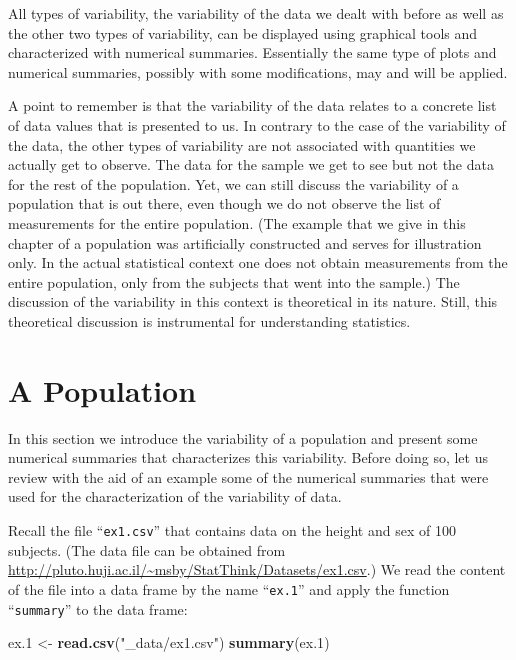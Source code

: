 \documentclass[
]{krantz}
\makeatletter
\newenvironment{Shaded}{\begin{snugshade}}{\end{snugshade}}
\newcommand{\FloatTok}[1]{\textcolor[rgb]{0.00,0.00,0.81}{#1}}
\newcommand{\KeywordTok}[1]{\textcolor[rgb]{0.13,0.29,0.53}{\textbf{#1}}}
\newcommand{\NormalTok}[1]{#1}
\newcommand{\StringTok}[1]{\textcolor[rgb]{0.31,0.60,0.02}{#1}}
\newenvironment{kframe}{%
\medskip{}
\setlength{\fboxsep}{.8em}
 \def\at@end@of@kframe{}%
 \ifinner\ifhmode%
  \def\at@end@of@kframe{\end{minipage}}%
  \begin{minipage}{\columnwidth}%
 \fi\fi%
 \def\FrameCommand##1{\hskip\@totalleftmargin \hskip-\fboxsep
 \colorbox{shadecolor}{##1}\hskip-\fboxsep
     \hskip-\linewidth \hskip-\@totalleftmargin \hskip\columnwidth}%
 \MakeFramed {\advance\hsize-\width
   \@totalleftmargin\z@ \linewidth\hsize
   \@setminipage}}%
 {\par\unskip\endMakeFramed%
 \at@end@of@kframe}
\renewenvironment{Shaded}{\begin{kframe}}{\end{kframe}}
\theoremstyle{definition}
\theoremstyle{definition}
\theoremstyle{definition}
\theoremstyle{remark}
\makeatother
\begin{document}
All types of variability, the variability of the data we dealt with
before as well as the other two types of variability, can be displayed
using graphical tools and characterized with numerical summaries.
Essentially the same type of plots and numerical summaries, possibly
with some modifications, may and will be applied.

A point to remember is that the variability of the data relates to a
concrete list of data values that is presented to us. In contrary to the
case of the variability of the data, the other types of variability are
not associated with quantities we actually get to observe. The data for
the sample we get to see but not the data for the rest of the
population. Yet, we can still discuss the variability of a population
that is out there, even though we do not observe the list of
measurements for the entire population. (The example that we give in
this chapter of a population was artificially constructed and serves for
illustration only. In the actual statistical context one does not obtain
measurements from the entire population, only from the subjects that
went into the sample.) The discussion of the variability in this context
is theoretical in its nature. Still, this theoretical discussion is
instrumental for understanding statistics.

\hypertarget{a-population}{%
\section{A Population}\label{a-population}}

In this section we introduce the variability of a population and present
some numerical summaries that characterizes this variability. Before
doing so, let us review with the aid of an example some of the numerical
summaries that were used for the characterization of the variability of
data.

Recall the file ``\texttt{ex1.csv}'' that contains data on the height and sex of
100 subjects. (The data file can be obtained from
\url{http://pluto.huji.ac.il/~msby/StatThink/Datasets/ex1.csv}.) We read the
content of the file into a data frame by the name ``\texttt{ex.1}'' and apply the
function ``\texttt{summary}'' to the data frame:

\begin{Shaded}
\begin{Highlighting}[]
\NormalTok{ex}\FloatTok{.1}\NormalTok{ <-}\StringTok{ }\KeywordTok{read.csv}\NormalTok{(}\StringTok{"_data/ex1.csv"}\NormalTok{)}
\KeywordTok{summary}\NormalTok{(ex}\FloatTok{.1}\NormalTok{)}
\end{Highlighting}
\end{Shaded}
\end{document}
